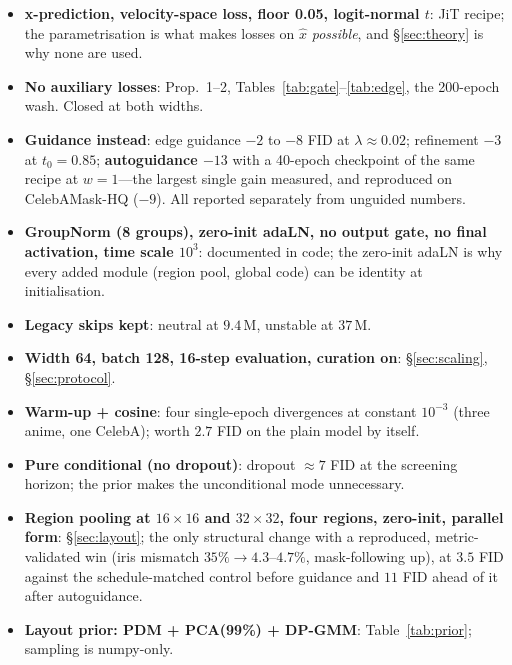\documentclass[11pt]{article}
\newcommand{\xh}{\hat{x}}
\begin{document}
\begin{itemize}[leftmargin=1.5em,itemsep=1pt]
\item \textbf{x-prediction, velocity-space loss, floor 0.05, logit-normal $t$}: JiT
      recipe; the parametrisation is what makes losses on $\xh$ \emph{possible}, and
      \S\ref{sec:theory} is why none are used.
\item \textbf{No auxiliary losses}: Prop.~1--2, Tables~\ref{tab:gate}--\ref{tab:edge},
      the 200-epoch wash. Closed at both widths.
\item \textbf{Guidance instead}: edge guidance $-2$ to $-8$ FID at $\lambda\approx0.02$;
      refinement $-3$ at $t_0=0.85$; \textbf{autoguidance $-13$} with a 40-epoch
      checkpoint of the same recipe at $w=1$---the largest single gain measured, and
      reproduced on CelebAMask-HQ ($-9$). All reported separately from unguided numbers.
\item \textbf{GroupNorm (8 groups), zero-init adaLN, no output gate, no final activation,
      time scale $10^3$}: documented in code; the zero-init adaLN is why every added
      module (region pool, global code) can be identity at initialisation.
\item \textbf{Legacy skips kept}: neutral at $9.4$\,M, unstable at $37$\,M.
\item \textbf{Width 64, batch 128, 16-step evaluation, curation on}: \S\ref{sec:scaling},
      \S\ref{sec:protocol}.
\item \textbf{Warm-up + cosine}: four single-epoch divergences at constant $10^{-3}$
      (three anime, one CelebA); worth $2.7$ FID on the plain model by itself.
\item \textbf{Pure conditional (no dropout)}: dropout $\approx7$ FID at the screening
      horizon; the prior makes the unconditional mode unnecessary.
\item \textbf{Region pooling at $16\times16$ and $32\times32$, four regions, zero-init,
      parallel form}: \S\ref{sec:layout}; the only structural change with a reproduced,
      metric-validated win (iris mismatch $35\%\to4.3$--$4.7\%$, mask-following up), at
      $3.5$ FID against the schedule-matched control before guidance and $11$ FID ahead
      of it after autoguidance.
\item \textbf{Layout prior: PDM + PCA(99\%) + DP-GMM}: Table~\ref{tab:prior}; sampling
      is numpy-only.
\end{itemize}
\end{document}
